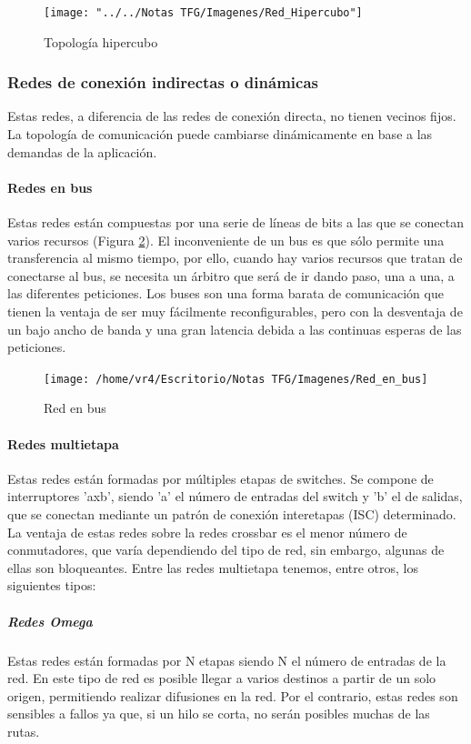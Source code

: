 \begin{figure}[H]
	\centering
	\texttt{[image: "../../Notas TFG/Imagenes/Red\_Hipercubo"]}
	\caption{Topología hipercubo}
	\label{fig:redhipercubo}
\end{figure}


\subsubsection{Redes de conexión indirectas o dinámicas}
Estas redes, a diferencia de las redes de conexión directa, no tienen vecinos fijos. La topología de comunicación puede cambiarse dinámicamente en base a las demandas de la aplicación. 

\paragraph{Redes en bus}
Estas redes están compuestas por una serie de líneas de bits a las que se conectan varios recursos (Figura \ref{fig:redenbus}). El inconveniente de un bus es que sólo permite una transferencia al mismo tiempo, por ello, cuando hay varios recursos que tratan de conectarse al bus, se necesita un árbitro que será de ir dando paso, una a una, a las diferentes peticiones. Los buses son una forma barata de comunicación que tienen la ventaja de ser muy fácilmente reconfigurables, pero con la desventaja de un bajo ancho de banda y una gran latencia debida a las continuas esperas de las peticiones.
	
	\begin{figure}[H]
		\centering
		\texttt{[image: /home/vr4/Escritorio/Notas TFG/Imagenes/Red\_en\_bus]}
		\caption{Red en bus}
		\label{fig:redenbus}
	\end{figure}

\paragraph{Redes multietapa}	
Estas redes están formadas por múltiples etapas de switches. Se compone de interruptores 'axb', siendo 'a' el número de entradas del switch y 'b' el de salidas, que se conectan mediante un patrón de conexión interetapas (ISC) determinado. La ventaja de estas redes sobre la redes crossbar es el menor número de conmutadores, que varía dependiendo del tipo de red, sin embargo, algunas de ellas son bloqueantes. Entre las redes multietapa tenemos, entre otros, los siguientes tipos:
	

\subparagraph{Redes Omega}
Estas redes están formadas por N etapas siendo N el número de entradas de la red. En este tipo de red es posible llegar a varios destinos a partir de un solo origen, permitiendo realizar difusiones en la red. Por el contrario, estas redes son sensibles a fallos ya que, si un hilo se corta, no serán posibles muchas de las rutas.

